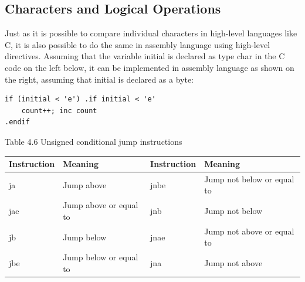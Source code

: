 \documentclass[10pt]{book}
\begin{document}
\subsection{Characters and Logical Operations}
Just as it is possible to compare individual characters in high-level languages like C, it is also possible to do the same in assembly language using high-level directives. Assuming that the variable initial is declared as type char in the C code on the left below, it can be implemented in assembly language as shown on the right, assuming that initial is declared as a byte:

\begin{verbatim}
if (initial < 'e') .if initial < 'e'
    count++; inc count
.endif
\end{verbatim}

Table 4.6 Unsigned conditional jump instructions

\begin{center}
\begin{tabular}{|l|l|l|l|}
\hline
Instruction & Meaning & Instruction & Meaning \\
\hline
ja & Jump above & jnbe & Jump not below or equal to \\
\hline
jae & Jump above or equal to & jnb & Jump not below \\
\hline
jb & Jump below & jnae & Jump not above or equal to \\
\hline
jbe & Jump below or equal to & jna & Jump not above \\
\hline
\end{tabular}
\end{center}
\end{document}
